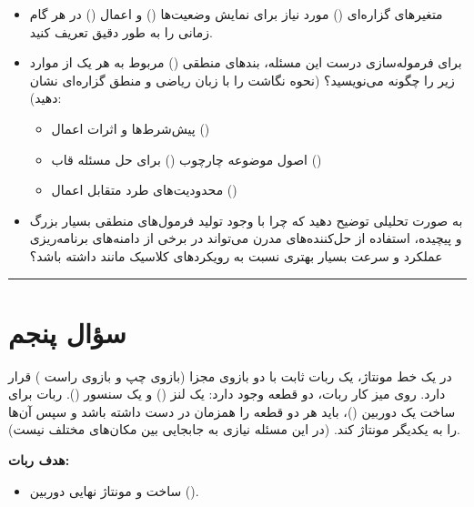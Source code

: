 \documentclass[a4paper,10pt]{article}
\begin{document}
	\begin{itemize}
		\item[الف)] متغیرهای گزاره‌ای () مورد نیاز برای نمایش وضعیت‌ها () و اعمال () در هر گام زمانی را به طور دقیق تعریف کنید.
		\item[ب)] برای فرموله‌سازی درست این مسئله، بندهای منطقی () مربوط به هر یک از موارد زیر را چگونه می‌نویسید؟ (نحوه نگاشت را با زبان ریاضی و منطق گزاره‌ای نشان دهید):
		\begin{itemize}
			\item پیش‌شرط‌ها و اثرات اعمال ()
			\item اصول موضوعه چارچوب () برای حل مسئله قاب ()
			\item محدودیت‌های طرد متقابل اعمال ()
		\end{itemize}
		\item[ج)] به صورت تحلیلی توضیح دهید که چرا با وجود تولید فرمول‌های منطقی بسیار بزرگ و پیچیده، استفاده از حل‌کننده‌های مدرن  می‌تواند در برخی از دامنه‌های برنامه‌ریزی عملکرد و سرعت بسیار بهتری نسبت به رویکردهای کلاسیک مانند  داشته باشد؟
	\end{itemize}
	
	\bigskip
	\bigskip
	\textcolor{AccentCyan}{\rule{\linewidth}{0.4pt}}
	\section{\textcolor{AccentGold}{سؤال پنجم}}
	
	در یک خط مونتاژ، یک ربات ثابت با دو بازوی مجزا (بازوی چپ  و بازوی راست ) قرار دارد. روی میز کار ربات، دو قطعه وجود دارد: یک لنز () و یک سنسور (). ربات برای ساخت یک دوربین ()، باید هر دو قطعه را همزمان در دست داشته باشد و سپس آن‌ها را به یکدیگر مونتاژ کند. (در این مسئله نیازی به جابجایی بین مکان‌های مختلف نیست).
	
	\vspace{1em}
	\textbf{هدف ربات:}
	\begin{itemize}
		\item ساخت و مونتاژ نهایی دوربین ().
	\end{itemize}
	
\end{document}
